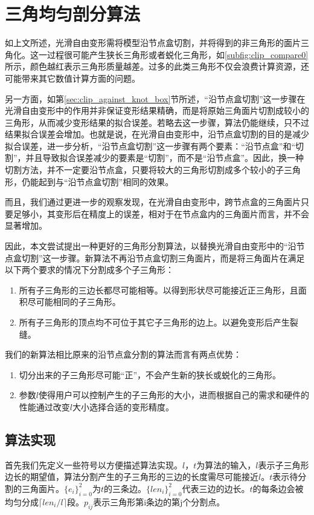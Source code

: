 
\chapter{三角均匀剖分算法}
如上文所述，光滑自由变形需将模型沿节点盒切割，并将得到的非三角形的面片三角化。这一过程很可能产生狭长三角形或者蜕化三角形，如\autoref{subfig:clip_compare0}所示，颜色越红表示三角形质量越差。过多的此类三角形不仅会浪费计算资源，还可能带来其它数值计算方面的问题。

另一方面，如第\autoref{sec:clip_against_knot_box}节所述，“沿节点盒切割”这一步骤在光滑自由变形中的作用并非保证变形结果精确，而是将原始三角面片切割成较小的三角形，从而减少变形结果的拟合误差。若略去这一步骤，算法仍能继续，只不过结果拟合误差会增加。也就是说，在光滑自由变形中，沿节点盒切割的目的是减少拟合误差，进一步分析，“沿节点盒切割”这一步骤有两个要素：“沿节点盒”和“切割”，并且导致拟合误差减少的要素是“切割”，而不是“沿节点盒”。因此，换一种切割方法，并不一定要沿节点盒，只要将较大的三角形切割成多个较小的子三角形，仍能起到与“沿节点盒切割”相同的效果。

而且，我们通过更进一步的观察发现，在光滑自由变形中，跨节点盒的三角面片只要足够小，其变形后在精度上的误差，相对于在节点盒内的三角面片而言，并不会显著增加。

因此，本文尝试提出一种更好的三角形分割算法，以替换光滑自由变形中的“沿节点盒切割”这一步骤。新算法不再沿节点盒切割三角面片，而是将三角面片在满足以下两个要求的情况下分割成多个子三角形：
\begin{enumerate}
    \item 所有子三角形的三边长都尽可能相等。以得到形状尽可能接近正三角形，且面积尽可能相同的子三角形。
    \item 所有子三角形的顶点均不可位于其它子三角形的边上。以避免变形后产生裂缝。
\end{enumerate}

我们的新算法相比原来的沿节点盒分割的算法而言有两点优势：
\begin{enumerate}
        \item 切分出来的子三角形尽可能“正”，不会产生新的狭长或蜕化的三角形。
        \item 参数$l$使得用户可以控制产生的子三角形的大小，进而根据自己的需求和硬件的性能通过改变$l$大小选择合适的变形精度。
\end{enumerate}

\section{算法实现} \label{clip_algorithm}
首先我们先定义一些符号以方便描述算法实现。$l$，$t$为算法的输入，$l$表示子三角形边长的期望值，算法分割产生的子三角形的三边的长度需尽可能接近$l$。$t$表示待分割的三角面片。$\{e_i\}^{2}_{i=0}$为$t$的三条边。$\{len_i\}^{2}_{i=0}$代表三边的边长。$t$的每条边会被均匀分成$\lceil len_i/l \rceil$段。$p_{ij}$表示三角形第i条边的第j个分割点。


